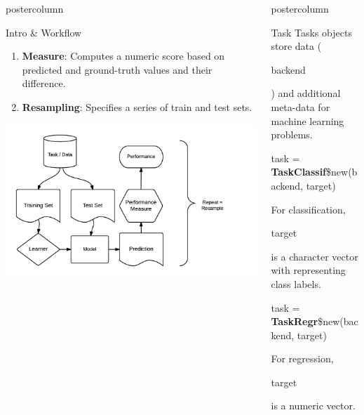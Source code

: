 \documentclass{beamer}
\newlength{\columnheight} %
\newcommand{\codeinline}[1]{\begin{codeboxinline}#1\end{codeboxinline}}
\begin{document}
\begin{frame}[fragile]{}
\begin{columns}
\begin{column}{.245\textwidth}
\begin{beamercolorbox}[center]{postercolumn}
\begin{minipage}{.98\textwidth}
{\begin{myblock}{Intro \& Workflow}
\begin{enumerate}
								\item \textbf{Measure}: Computes a numeric score based on predicted and ground-truth values and their difference.
								\item \textbf{Resampling}: Specifies a series of train and test sets.
							\end{enumerate}
							\includegraphics[width=\textwidth]{img/ml_abstraction.png}
						\end{myblock}
					}
				\end{minipage}
			\end{beamercolorbox}
		\end{column}
		\begin{column}{.245\textwidth}
			\begin{beamercolorbox}[center]{postercolumn}
				\begin{minipage}{.98\textwidth}
					\parbox[t][\columnheight]{\textwidth}{
						\begin{myblock}{Task}
							Tasks objects store data (\codeinline{backend}) and additional meta-data for machine learning problems.
							\\
							\begin{codebox}
								task = \textbf{TaskClassif}\$new(backend, target)
							\end{codebox}
							For classification, \codeinline{target} is a character vector with representing class labels.
							\\
							\begin{codebox}
								task = \textbf{TaskRegr}\$new(backend, target)
							\end{codebox}
							For regression, \codeinline{target} is a numeric vector.
							\\
							\begin{codebox}

\end{codebox}
\end{myblock}}
\end{minipage}
\end{beamercolorbox}
\end{column}
\end{columns}
\end{frame}
\end{document}
